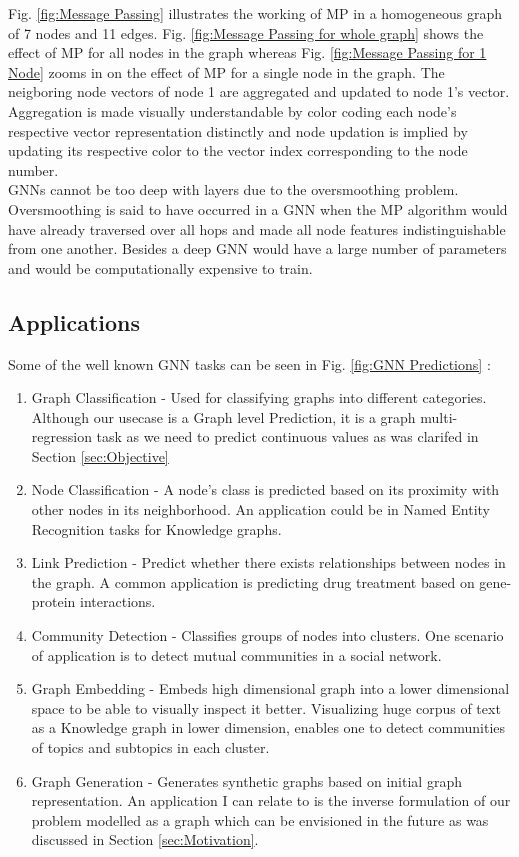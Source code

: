 \documentclass{report} %
\begin{document}
Fig. \ref{fig:Message Passing} illustrates the working of \ac{MP} in a homogeneous graph of 7 nodes and 11 edges. Fig. \ref{fig:Message Passing for whole graph} shows 
the effect of \ac{MP} for all nodes in the graph  whereas Fig. \ref{fig:Message Passing for 1 Node} zooms in on the effect of \ac{MP} for a single node in the graph.
The neigboring node vectors of node 1 are aggregated and updated to node 1's vector. Aggregation is made visually understandable by color coding each node's respective 
vector representation distinctly and node updation is implied by updating its respective color to the vector index corresponding to the node number. \\

\ac{GNN}s cannot be too deep with layers due to the oversmoothing problem. 
Oversmoothing is said to have occurred in a \ac{GNN} when the \ac{MP} algorithm would have already traversed over all hops and made all node features indistinguishable 
from one another. Besides a deep \ac{GNN} would have a large number of parameters and would be computationally expensive to train.

\subsection{Applications}\label{subsec:Applications}

Some of the well known \ac{GNN} tasks can be seen in Fig. \ref{fig:GNN Predictions} :
\begin{enumerate}
    \item Graph Classification - Used for classifying graphs into different categories. Although our usecase is a Graph level Prediction, it is a graph multi-regression 
    task as we need to predict continuous values as was clarifed in Section \ref{sec:Objective}
    \item Node Classification - A node's class is predicted based on its proximity with other nodes in its neighborhood. An application could be in Named Entity 
    Recognition tasks for Knowledge graphs.
    \item Link Prediction - Predict whether there exists relationships between nodes in the graph. A common application is predicting drug treatment based on gene-protein interactions.
    \item Community Detection - Classifies groups of nodes into clusters. One scenario of application is to detect mutual communities in a social network.
    \item Graph Embedding - Embeds high dimensional graph into a lower dimensional space to be able to visually inspect it better. Visualizing huge corpus of text as a 
    Knowledge graph in lower dimension, enables one to detect communities of topics and subtopics in each cluster.
    \item Graph Generation - Generates synthetic graphs based on initial graph representation. An application I can relate to is the inverse formulation of our problem 
    modelled as a graph which can be envisioned in the future as was discussed in Section \ref{sec:Motivation}.
\end{enumerate}
\end{document}
